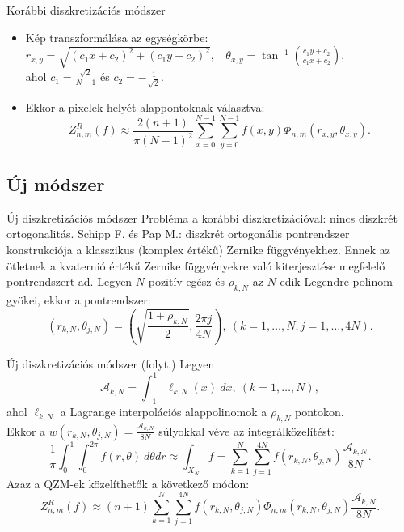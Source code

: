 \documentclass{beamer}
\begin{document}
\begin{frame}{Korábbi diszkretizációs módszer}
\begin{figure}[tb]
\begin{subfigure}{.30\textwidth}
          \end{subfigure}
      \end{figure}
      \begin{itemize}
          \item Kép transzformálása az egységkörbe: \\
                $r_{x,y} = \sqrt{(c_1x + c_2)^2 + (c_1y + c_2)^2},\ \ \ \  \theta_{x,y} = \tan^{-1}\left(\frac{c_1y + c_2}{c_1x + c_2}\right),$\\
                ahol $c_1 = \frac{\sqrt{2}}{N-1}$ és $c_2 = -\frac{1}{\sqrt{2}}$.
          \item Ekkor a pixelek helyét alappontoknak választva:\\
                $$Z^R_{n,m}(f) \approx \frac{2(n+1)}{\pi(N-1)^2}\sum_{x=0}^{N-1}\sum_{y=0}^{N-1}f(x,y)\Phi_{n,m}(r_{x,y},\theta_{x,y}).$$
      \end{itemize}
\end{frame}

\subsection{Új módszer}
\begin{frame}{Új diszkretizációs módszer}
    Probléma a korábbi diszkretizációval: nincs diszkrét ortogonalitás.
    \vskip 5mm
    Schipp F. és Pap M.: diszkrét ortogonális pontrendszer konstrukciója a klasszikus (komplex értékű) Zernike függvényekhez.
    \vskip 3mm
    Ennek az ötletnek a kvaternió értékű Zernike függvényekre való kiterjesztése megfelelő pontrendszert ad.
    \vskip 3mm
    Legyen $N$ pozitív egész és $\rho_{k,N}$ az $N$-edik Legendre polinom gyökei, ekkor a pontrendszer:
    $$(r_{k,N}, \theta_{j,N}) = \left(\sqrt{\frac{1+\rho_{k,N}}{2}} , \frac{2\pi j}{4N} \right), \ (k=1,\ldots,N,j=1,\ldots,4N).$$
    
\end{frame}

\begin{frame}{Új diszkretizációs módszer (folyt.)}
    \vskip 5mm
    Legyen $$\mathcal{A}_{k,N} = \int_{-1}^{1} \ell_{k,N}(x)\ dx, \ (k=1,\ldots,N),$$ ahol $\ell_{k,N}$ a Lagrange interpolációs alappolinomok a $\rho_{k,N}$ pontokon.\\
    Ekkor a $w(r_{k,N},\theta_{j,N}) = \frac{\mathcal{A}_{k,N}}{8N}$ súlyokkal véve az integrálközelítést:
    $$\frac{1}{\pi} \int_{0}^1 \int_0^{2\pi} f(r,\theta)\ d\theta dr \approx \int_{X_N} f = \sum_{k=1}^{N} \sum_{j=1}^{4N} f(r_{k,N},\theta_{j,N}) \frac{\mathcal{A}_{k,N}}{8N}.$$
    Azaz a QZM-ek közelíthetők a következő módon:
    $$Z^R_{n,m}(f) \approx (n+1)\sum_{k=1}^{N}\sum_{j=1}^{4N}f(r_{k,N},\theta_{j,N})\Phi_{n,m}(r_{k,N},\theta_{j,N})\frac{\mathcal{A}_{k,N}}{8N}.$$

\end{frame}
\end{document}
